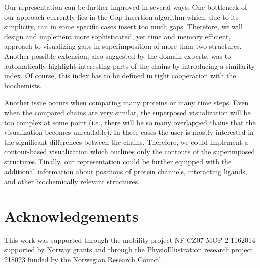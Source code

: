 \documentclass[twocolumn]{bmcart}%
\begin{document}
Our representation can be further improved in several ways. 
One bottleneck of our approach currently lies in the Gap Insertion algorithm which, due to its simplicity, can in some specific cases insert too much gaps.
Therefore, we will design and implement more sophisticated, yet time and memory efficient, approach to visualizing gaps in superimposition of more than two structures.
Another possible extension, also suggested by the domain experts, was to automatically highlight interesting parts of the chains by introducing a similarity index.
Of course, this index has to be defined in tight cooperation with the biochemists.

Another issue occurs when comparing many proteins or many time steps.
Even when the compared chains are very similar, the superposed visualization will be too complex at some point (i.e., there will be so many overlapped chains that the visualization becomes unreadable).
In these cases the user is mostly interested in the significant differences between the chains.
Therefore, we could implement a contour-based visualization which outlines only the contours of the superimposed structures.
Finally, our representation could be further equipped with the additional information about positions of protein channels, interacting ligands, and other biochemically relevant structures.

\section*{Acknowledgements}
This work was supported through the mobility project NF-CZ07-MOP-2-1162014 supported by Norway grants and through the PhysioIllustration research project 218023 funded by the Norwegian Research Council.
\end{document}
